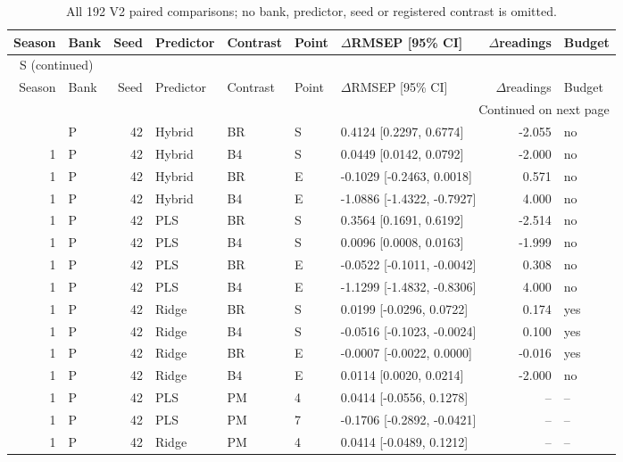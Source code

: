 \documentclass[10pt,a4paper]{article}
\renewcommand{\thetable}{S\arabic{table}}
\begin{document}
\clearpage
\begin{landscape}
\begingroup\footnotesize
\setlength{\tabcolsep}{3.5pt}
\renewcommand{\arraystretch}{1.10}
\begin{longtable}{rlrllllrl}
\caption{All 192 V2 paired comparisons; no bank, predictor, seed or registered contrast is omitted.}\label{tab:v2paired}\\
\toprule
Season & Bank & Seed & Predictor & Contrast & Point & $\Delta$RMSEP [95\% CI] & $\Delta$readings & Budget \\
\midrule
\endfirsthead
\multicolumn{9}{l}{\tablename~\thetable{} (continued)}\\
\toprule
Season & Bank & Seed & Predictor & Contrast & Point & $\Delta$RMSEP [95\% CI] & $\Delta$readings & Budget \\
\midrule
\endhead
\midrule
\multicolumn{9}{r}{Continued on next page}\\
\endfoot
\bottomrule
\endlastfoot
1 & P & 42 & Hybrid & BR & S & 0.4124 [0.2297, 0.6774] & -2.055 & no \\
1 & P & 42 & Hybrid & B4 & S & 0.0449 [0.0142, 0.0792] & -2.000 & no \\
1 & P & 42 & Hybrid & BR & E & -0.1029 [-0.2463, 0.0018] & 0.571 & no \\
1 & P & 42 & Hybrid & B4 & E & -1.0886 [-1.4322, -0.7927] & 4.000 & no \\
1 & P & 42 & PLS & BR & S & 0.3564 [0.1691, 0.6192] & -2.514 & no \\
1 & P & 42 & PLS & B4 & S & 0.0096 [0.0008, 0.0163] & -1.999 & no \\
1 & P & 42 & PLS & BR & E & -0.0522 [-0.1011, -0.0042] & 0.308 & no \\
1 & P & 42 & PLS & B4 & E & -1.1299 [-1.4832, -0.8306] & 4.000 & no \\
1 & P & 42 & Ridge & BR & S & 0.0199 [-0.0296, 0.0722] & 0.174 & yes \\
1 & P & 42 & Ridge & B4 & S & -0.0516 [-0.1023, -0.0024] & 0.100 & yes \\
1 & P & 42 & Ridge & BR & E & -0.0007 [-0.0022, 0.0000] & -0.016 & yes \\
1 & P & 42 & Ridge & B4 & E & 0.0114 [0.0020, 0.0214] & -2.000 & no \\
1 & P & 42 & PLS & PM & 4 & 0.0414 [-0.0556, 0.1278] & -- & -- \\
1 & P & 42 & PLS & PM & 7 & -0.1706 [-0.2892, -0.0421] & -- & -- \\
1 & P & 42 & Ridge & PM & 4 & 0.0414 [-0.0489, 0.1212] & -- & -- \\

\end{longtable}
\end{landscape}
\end{document}
